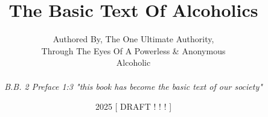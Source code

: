 \title{The Basic Text Of Alcoholics}
\author{Authored By, The One Ultimate Authority, \\
    Through The Eyes Of A Powerless \& Anonymous \\
    Alcoholic \\
    \\
    \emph{B.B. 2 Preface 1:3 "this book has become the basic text of our society"} \\
}
\date{2025 [ DRAFT ! ! ! ]}
\newcommand{\logo}{%
    symbol1.png
}

\setstocksize{9in}{6in}%
\settrimmedsize{9in}{6in}{*}
\settrims{0in}{0in}

\setcolsepandrule{0.1875in}{0pt}

\settypeblocksize{*}{5.1125in}{*}  %

\checkandfixthelayout

\newcommand{\bbcontentsname}{%
    \headings Books of The Basic Text of A.
}

\renewcommand{\textcopyright}{%
    {\fontfamily{DejaVuSerif-TLF}\selectfont ©}
}

\newcommand{\bbChapterPreamble}{%
    \bbHeading{Chapter-Book Preamble}
        Extract from Alcoholics Anonymous 2nd Ed., 
        \textcopyright A.A.W.S. Inc., 
        which is in the U.S. public domain.
        The text is used here for transformation into the verse form of a basic text 
        to facillitate verse based study and commentary.
}
